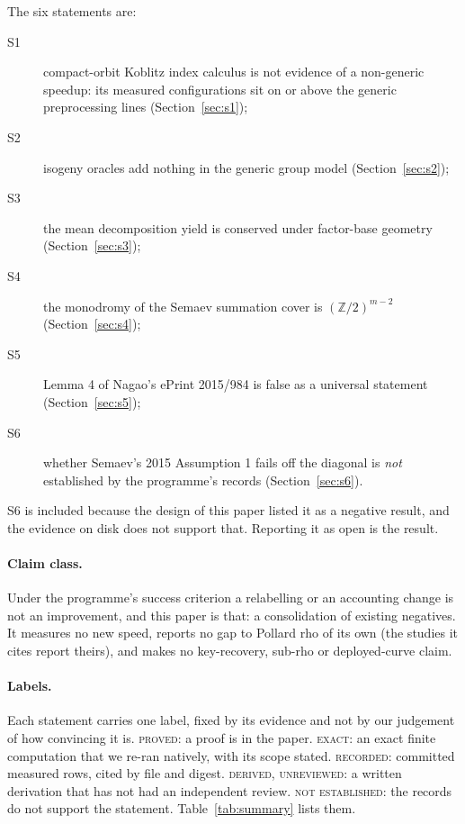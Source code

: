 \documentclass[10pt,a4paper]{article}
\newcommand{\ZZ}{\mathbb{Z}}
\theoremstyle{definition}
\theoremstyle{remark}
\begin{document}
The six statements are:
\begin{description}
\item[S1] compact-orbit Koblitz index calculus is not evidence of a non-generic
  speedup: its measured configurations sit on or above the generic
  preprocessing lines (Section~\ref{sec:s1});
\item[S2] isogeny oracles add nothing in the generic group model
  (Section~\ref{sec:s2});
\item[S3] the mean decomposition yield is conserved under factor-base geometry
  (Section~\ref{sec:s3});
\item[S4] the monodromy of the Semaev summation cover is $(\ZZ/2)^{m-2}$
  (Section~\ref{sec:s4});
\item[S5] Lemma 4 of Nagao's ePrint 2015/984 is false as a universal statement
  (Section~\ref{sec:s5});
\item[S6] whether Semaev's 2015 Assumption 1 fails off the diagonal is
  \emph{not} established by the programme's records (Section~\ref{sec:s6}).
\end{description}
S6 is included because the design of this paper listed it as a negative result,
and the evidence on disk does not support that. Reporting it as open is the
result.

\paragraph{Claim class.}
Under the programme's success criterion a relabelling or an accounting change is
not an improvement, and this paper is that: a consolidation of existing
negatives. It measures no new speed, reports no gap to Pollard rho of its own
(the studies it cites report theirs), and makes no key-recovery, sub-rho or
deployed-curve claim.

\paragraph{Labels.}
Each statement carries one label, fixed by its evidence and not by our
judgement of how convincing it is.
\textsc{proved}: a proof is in the paper.
\textsc{exact}: an exact finite computation that we re-ran natively, with its
scope stated.
\textsc{recorded}: committed measured rows, cited by file and digest.
\textsc{derived, unreviewed}: a written derivation that has not had an
independent review.
\textsc{not established}: the records do not support the statement.
Table~\ref{tab:summary} lists them.
\end{document}
